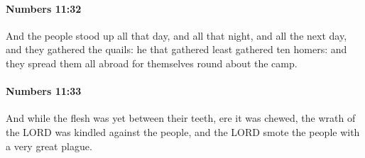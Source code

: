 		\paragraph{Numbers 11:32} %
			\label{NUMBERS-11-32}

			And the people stood up all that day, and all that night, and all the next day, and they gathered the quails: he that gathered least gathered ten homers: and they spread them all abroad for themselves round about the camp.


		\paragraph{Numbers 11:33} %
			\label{NUMBERS-11-33}

			And while the flesh was yet between their teeth, ere it was chewed, the wrath of the LORD was kindled against the people, and the LORD smote the people with a very great plague.

